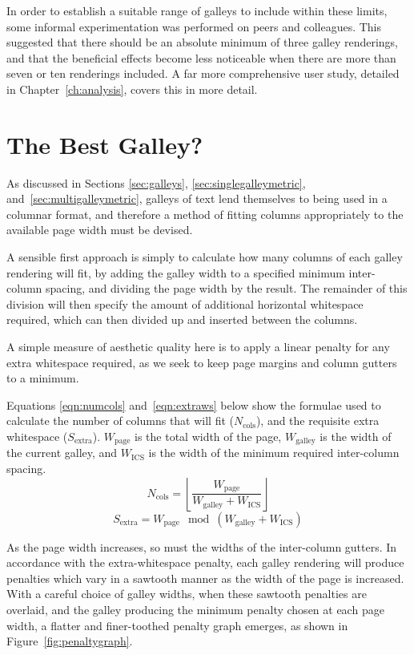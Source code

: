In order to establish a suitable range of galleys to include within these limits, some informal experimentation was performed on peers and colleagues. This suggested that there should be an absolute minimum of three galley renderings, and that the beneficial effects become less noticeable when there are more than seven or ten renderings included. A far more comprehensive user study, detailed in Chapter~\ref{ch:analysis}, covers this in more detail.

\section{The Best Galley?}
\label{sec:layout}

As discussed in Sections \ref{sec:galleys}, \ref{sec:singlegalleymetric}, and~\ref{sec:multigalleymetric}, galleys of text lend themselves to being used in a columnar format, and therefore a method of fitting columns appropriately to the available page width must be devised.

A sensible first approach is simply to calculate how many columns of each galley rendering will fit, by adding the galley width to a specified minimum inter-col\-umn spacing, and dividing the page width by the result. The remainder of this division will then specify the amount of additional horizontal whitespace required, which can then divided up and inserted between the columns.

A simple measure of aesthetic quality here is to apply a linear penalty for any extra whitespace required, as we seek to keep page margins and column gutters to a minimum.

Equations \ref{eqn:numcols} and~\ref{eqn:extraws} below show the formulae used to calculate the number of columns that will fit ($N_\text{cols}$), and the requisite extra whitespace ($S_\text{extra}$). $W_\text{page}$ is the total width of the page, $W_\text{galley}$ is the width of the current galley, and $W_\text{ICS}$ is the width of the minimum required inter-col\-umn spacing.
\begin{equation}\label{eqn:numcols}
N_\text{cols}=\left\lfloor\frac{W_\text{page}}{W_\text{galley}+W_\text{ICS}}\right\rfloor
\end{equation}
\begin{equation}\label{eqn:extraws}
S_\text{extra}=W_\text{page}\!\!\mod \left(W_\text{galley}+W_\text{ICS}\right)
\end{equation}

As the page width increases, so must the widths of the inter-col\-umn gutters. In accordance with the extra-whitespace penalty, each galley rendering will produce penalties which vary in a sawtooth manner as the width of the page is increased. With a careful choice of galley widths, when these sawtooth penalties are overlaid, and the galley producing the minimum penalty chosen at each page width, a flatter and finer-toothed penalty graph emerges, as shown in Figure~\ref{fig:penaltygraph}.

